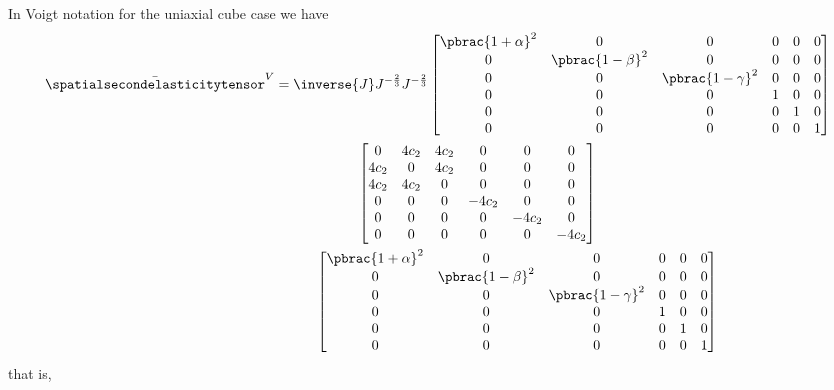 In Voigt notation for the uniaxial cube case we have
\begin{multline}
  \bar{\spatialsecondelasticitytensor}^{V}=\inverse{J}J^{-\frac{2}{3}}J^{-\frac{2}{3}}\begin{bmatrix}
    \pbrac{1+\alpha}^{2} & 0 & 0 & 0 & 0 & 0\\
    0 & \pbrac{1-\beta}^{2} & 0 & 0 & 0 & 0\\
    0 & 0 & \pbrac{1-\gamma}^{2} & 0 & 0 & 0\\
    0 & 0 & 0 & 1 & 0 & 0 \\
    0 & 0 & 0 & 0 & 1 & 0 \\
    0 & 0 & 0 & 0 & 0 & 1 
  \end{bmatrix}\\\hspace{2cm}\begin{bmatrix}
    0 & 4c_{2} & 4c_{2} & 0 & 0 & 0 \\
    4c_{2} & 0 & 4c_{2} & 0 & 0 & 0 \\
    4c_{2} & 4c_{2} & 0 & 0 & 0 & 0 \\
    0     & 0      & 0 & -4c_{2} & 0 & 0 \\
    0     & 0      & 0 & 0      & -4c_{2} & 0 \\
    0     & 0      & 0 & 0      & 0      & -4c_{2} 
  \end{bmatrix}\\\hspace{4cm}\begin{bmatrix}
    \pbrac{1+\alpha}^{2} & 0 & 0 & 0 & 0 & 0\\
    0 & \pbrac{1-\beta}^{2} & 0 & 0 & 0 & 0\\
    0 & 0 & \pbrac{1-\gamma}^{2} & 0 & 0 & 0\\
    0 & 0 & 0 & 1 & 0 & 0 \\
    0 & 0 & 0 & 0 & 1 & 0 \\
    0 & 0 & 0 & 0 & 0 & 1 
  \end{bmatrix}\\
\end{multline}
that is,
